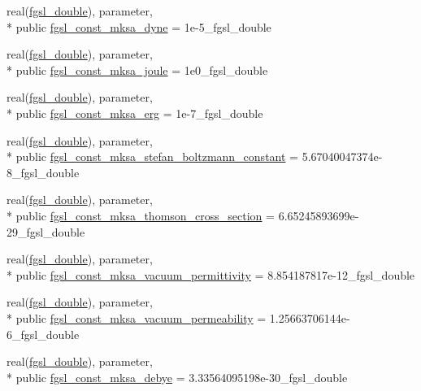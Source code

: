 \begin{DoxyCompactItemize}
\item 
real(\hyperlink{classfgsl_a9af5113378e0f000eb479d3f90196ddf}{fgsl\-\_\-double}), parameter, \\*
public \hyperlink{classfgsl_a17365a3e64a2dd83aea9ebba6757fd7b}{fgsl\-\_\-const\-\_\-mksa\-\_\-dyne} = 1e-\/5\-\_\-fgsl\-\_\-double
\item 
real(\hyperlink{classfgsl_a9af5113378e0f000eb479d3f90196ddf}{fgsl\-\_\-double}), parameter, \\*
public \hyperlink{classfgsl_a2bb10acb778e8412e7c0bc7e7f95787b}{fgsl\-\_\-const\-\_\-mksa\-\_\-joule} = 1e0\-\_\-fgsl\-\_\-double
\item 
real(\hyperlink{classfgsl_a9af5113378e0f000eb479d3f90196ddf}{fgsl\-\_\-double}), parameter, \\*
public \hyperlink{classfgsl_a7135370afba011fa6c30a3028af76f15}{fgsl\-\_\-const\-\_\-mksa\-\_\-erg} = 1e-\/7\-\_\-fgsl\-\_\-double
\item 
real(\hyperlink{classfgsl_a9af5113378e0f000eb479d3f90196ddf}{fgsl\-\_\-double}), parameter, \\*
public \hyperlink{classfgsl_a730c5b5646585a81247eaa92703505da}{fgsl\-\_\-const\-\_\-mksa\-\_\-stefan\-\_\-boltzmann\-\_\-constant} = 5.\-67040047374e-\/8\-\_\-fgsl\-\_\-double
\item 
real(\hyperlink{classfgsl_a9af5113378e0f000eb479d3f90196ddf}{fgsl\-\_\-double}), parameter, \\*
public \hyperlink{classfgsl_a6db1579c2961f86ba36e1ec23eea34cf}{fgsl\-\_\-const\-\_\-mksa\-\_\-thomson\-\_\-cross\-\_\-section} = 6.\-65245893699e-\/29\-\_\-fgsl\-\_\-double
\item 
real(\hyperlink{classfgsl_a9af5113378e0f000eb479d3f90196ddf}{fgsl\-\_\-double}), parameter, \\*
public \hyperlink{classfgsl_a74a2728881184d5037b397e55d24411d}{fgsl\-\_\-const\-\_\-mksa\-\_\-vacuum\-\_\-permittivity} = 8.\-854187817e-\/12\-\_\-fgsl\-\_\-double
\item 
real(\hyperlink{classfgsl_a9af5113378e0f000eb479d3f90196ddf}{fgsl\-\_\-double}), parameter, \\*
public \hyperlink{classfgsl_a16aee30f6ddf44068a051e80be1f1e0e}{fgsl\-\_\-const\-\_\-mksa\-\_\-vacuum\-\_\-permeability} = 1.\-25663706144e-\/6\-\_\-fgsl\-\_\-double
\item 
real(\hyperlink{classfgsl_a9af5113378e0f000eb479d3f90196ddf}{fgsl\-\_\-double}), parameter, \\*
public \hyperlink{classfgsl_ad4022c36598c9b49cb3bc9497fcdc06c}{fgsl\-\_\-const\-\_\-mksa\-\_\-debye} = 3.\-33564095198e-\/30\-\_\-fgsl\-\_\-double

\end{DoxyCompactItemize}
